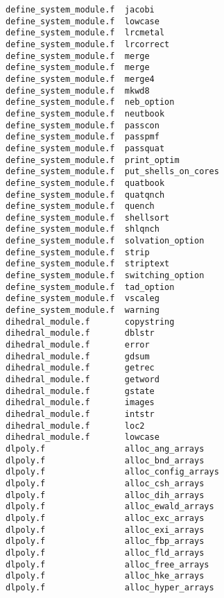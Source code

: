 \begin{verbatim}
define_system_module.f  jacobi                    
define_system_module.f  lowcase                   
define_system_module.f  lrcmetal                  
define_system_module.f  lrcorrect                 
define_system_module.f  merge                     
define_system_module.f  merge                     
define_system_module.f  merge4                    
define_system_module.f  mkwd8                     
define_system_module.f  neb_option                
define_system_module.f  neutbook                  
define_system_module.f  passcon                   
define_system_module.f  passpmf                   
define_system_module.f  passquat                  
define_system_module.f  print_optim               
define_system_module.f  put_shells_on_cores       
define_system_module.f  quatbook                  
define_system_module.f  quatqnch                  
define_system_module.f  quench                    
define_system_module.f  shellsort                 
define_system_module.f  shlqnch                   
define_system_module.f  solvation_option          
define_system_module.f  strip                     
define_system_module.f  striptext                 
define_system_module.f  switching_option          
define_system_module.f  tad_option                
define_system_module.f  vscaleg                   
define_system_module.f  warning                   
dihedral_module.f       copystring                
dihedral_module.f       dblstr                    
dihedral_module.f       error                     
dihedral_module.f       gdsum                     
dihedral_module.f       getrec                    
dihedral_module.f       getword                   
dihedral_module.f       gstate                    
dihedral_module.f       images                    
dihedral_module.f       intstr                    
dihedral_module.f       loc2                      
dihedral_module.f       lowcase                   
dlpoly.f                alloc_ang_arrays          
dlpoly.f                alloc_bnd_arrays          
dlpoly.f                alloc_config_arrays       
dlpoly.f                alloc_csh_arrays          
dlpoly.f                alloc_dih_arrays          
dlpoly.f                alloc_ewald_arrays        
dlpoly.f                alloc_exc_arrays          
dlpoly.f                alloc_exi_arrays          
dlpoly.f                alloc_fbp_arrays          
dlpoly.f                alloc_fld_arrays          
dlpoly.f                alloc_free_arrays         
dlpoly.f                alloc_hke_arrays          
dlpoly.f                alloc_hyper_arrays        

\end{verbatim}
